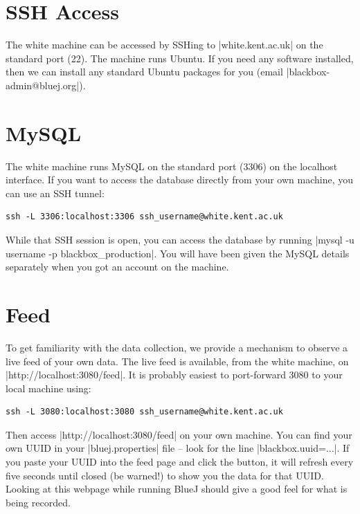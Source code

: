 \documentclass{report}
\begin{document}
\section{SSH Access}

The white machine can be accessed by SSHing to |white.kent.ac.uk| on the
standard port (22).  The machine runs Ubuntu.  If you need any software
installed, then we can install any standard Ubuntu packages for you (email
|blackbox-admin@bluej.org|).

\section{MySQL}
\label{sec:ssh-tunnel}

The white machine runs MySQL on the standard port (3306) on the localhost
interface.  If you want to access the database directly from your own machine,
you can use an SSH tunnel:

\begin{lstlisting}
ssh -L 3306:localhost:3306 ssh_username@white.kent.ac.uk
\end{lstlisting}

While that SSH session is open, you can access the database by running
|mysql -u username -p blackbox_production|.  You will have been given
the MySQL details separately when you got an account on the machine.

\section{Feed}

To get familiarity with the data collection, we provide a mechanism to observe
a live feed of your own data.  The live feed is available, from the
white machine, on |http://localhost:3080/feed|.  It is probably easiest to
port-forward 3080 to your local machine using:

\begin{lstlisting}
ssh -L 3080:localhost:3080 ssh_username@white.kent.ac.uk
\end{lstlisting}

Then access |http://localhost:3080/feed| on your own machine.  You can find
your own UUID in your |bluej.properties| file -- look for the line
|blackbox.uuid=...|.  If you paste your UUID into the feed page and click the
button, it will refresh every five seconds until closed (be warned!) to show
you the data for that UUID.  Looking at this webpage while running BlueJ
should give a good feel for what is being recorded.
\end{document}
